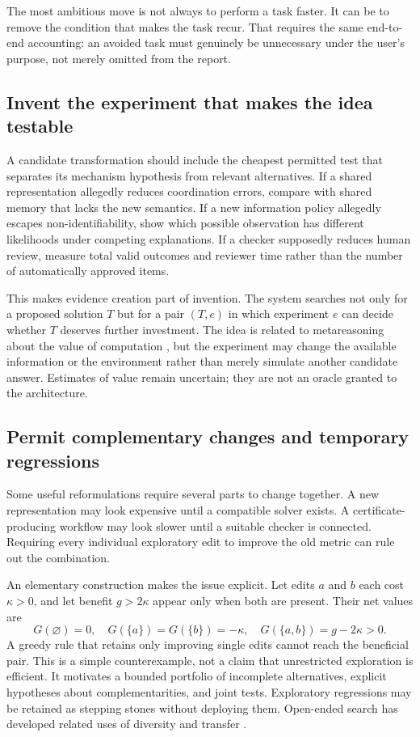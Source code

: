 \documentclass[11pt,letterpaper]{article}
\theoremstyle{remark}\newtheorem{remark}{Remark}[section]
\begin{document}
The most ambitious move is not always to perform a task faster. It can be to remove the condition that makes the task recur. That requires the same end-to-end accounting: an avoided task must genuinely be unnecessary under the user's purpose, not merely omitted from the report.

\subsection{Invent the experiment that makes the idea testable}
A candidate transformation should include the cheapest permitted test that separates its mechanism hypothesis from relevant alternatives. If a shared representation allegedly reduces coordination errors, compare with shared memory that lacks the new semantics. If a new information policy allegedly escapes non-identifiability, show which possible observation has different likelihoods under competing explanations. If a checker supposedly reduces human review, measure total valid outcomes and reviewer time rather than the number of automatically approved items.

This makes evidence creation part of invention. The system searches not only for a proposed solution $T$ but for a pair $(T,e)$ in which experiment $e$ can decide whether $T$ deserves further investment. The idea is related to metareasoning about the value of computation \citep{hay2012selecting}, but the experiment may change the available information or the environment rather than merely simulate another candidate answer. Estimates of value remain uncertain; they are not an oracle granted to the architecture.

\subsection{Permit complementary changes and temporary regressions}
Some useful reformulations require several parts to change together. A new representation may look expensive until a compatible solver exists. A certificate-producing workflow may look slower until a suitable checker is connected. Requiring every individual exploratory edit to improve the old metric can rule out the combination.

An elementary construction makes the issue explicit. Let edits $a$ and $b$ each cost $\kappa>0$, and let benefit $g>2\kappa$ appear only when both are present. Their net values are
\begin{equation}
G(\varnothing)=0,\quad G(\{a\})=G(\{b\})=-\kappa,\quad
G(\{a,b\})=g-2\kappa>0.\label{eq:complementarity}
\end{equation}
A greedy rule that retains only improving single edits cannot reach the beneficial pair. This is a simple counterexample, not a claim that unrestricted exploration is efficient. It motivates a bounded portfolio of incomplete alternatives, explicit hypotheses about complementarities, and joint tests. Exploratory regressions may be retained as stepping stones without deploying them. Open-ended search has developed related uses of diversity and transfer \citep{wang2019poet}.
\end{document}
